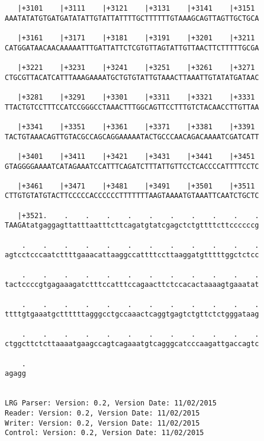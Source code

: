 \documentclass{article}
\begin{document}
\begin{Verbatim}
   |+3101    |+3111    |+3121    |+3131    |+3141    |+3151 
AAATATATGTGATGATATATTGTATTATTTTGCTTTTTTGTAAAGCAGTTAGTTGCTGCA
                                                            
   |+3161    |+3171    |+3181    |+3191    |+3201    |+3211 
CATGGATAACAACAAAAATTTGATTATTCTCGTGTTAGTATTGTTAACTTCTTTTTGCGA
                                                            
   |+3221    |+3231    |+3241    |+3251    |+3261    |+3271 
CTGCGTTACATCATTTAAAGAAAATGCTGTGTATTGTAAACTTAAATTGTATATGATAAC
                                                            
   |+3281    |+3291    |+3301    |+3311    |+3321    |+3331 
TTACTGTCCTTTCCATCCGGGCCTAAACTTTGGCAGTTCCTTTGTCTACAACCTTGTTAA
                                                            
   |+3341    |+3351    |+3361    |+3371    |+3381    |+3391 
TACTGTAAACAGTTGTACGCCAGCAGGAAAAATACTGCCCAACAGACAAAATCGATCATT
                                                            
   |+3401    |+3411    |+3421    |+3431    |+3441    |+3451 
GTAGGGGAAAATCATAGAAATCCATTTCAGATCTTTATTGTTCCTCACCCCATTTTCCTC
                                                            
   |+3461    |+3471    |+3481    |+3491    |+3501    |+3511 
CTTGTGTATGTACTTCCCCCACCCCCCTTTTTTTAAGTAAAATGTAAATTCAATCTGCTC
                                                            
   |+3521.    .    .    .    .    .    .    .    .    .    .
TAAGAtatgaggagttatttaatttcttcagatgtatcgagctctgttttcttccccccg
                                                            
    .    .    .    .    .    .    .    .    .    .    .    .
agtcctcccaatcttttgaaacattaaggccattttccttaaggatgtttttggctctcc
                                                            
    .    .    .    .    .    .    .    .    .    .    .    .
tactccccgtgagaaagatctttccatttccagaacttctccacactaaaagtgaaatat
                                                            
    .    .    .    .    .    .    .    .    .    .    .    .
ttttgtgaaatgcttttttagggcctgccaaactcaggtgagtctgttctctgggataag
                                                            
    .    .    .    .    .    .    .    .    .    .    .    .
ctggcttctcttaaaatgaagccagtcagaaatgtcagggcatcccaagattgaccagtc
                                                            
    .
agagg
     
     
LRG Parser: Version: 0.2, Version Date: 11/02/2015
Reader: Version: 0.2, Version Date: 11/02/2015
Writer: Version: 0.2, Version Date: 11/02/2015
Control: Version: 0.2, Version Date: 11/02/2015
\end{Verbatim}
\end{document}
